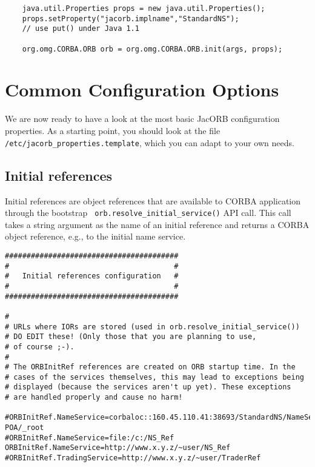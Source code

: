 \small{
\begin{verbatim}
    java.util.Properties props = new java.util.Properties();
    props.setProperty("jacorb.implname","StandardNS");
    // use put() under Java 1.1

    org.omg.CORBA.ORB orb = org.omg.CORBA.ORB.init(args, props);
\end{verbatim}
}

\section{Common Configuration Options}

We are now ready to have a look at the most basic JacORB configuration
properties. As a starting point, you should look at the file {\tt
  /etc/jacorb\_properties.template}, which you can adapt to your own
needs.

\subsection{Initial references}

Initial references are object references that are available to CORBA
application through the bootstrap {\tt
  orb.resolve\_initial\_service()} API call. This call takes a string
argument as the name of an initial reference and returns a CORBA
object reference, e.g., to the initial name service.

\renewcommand{\baselinestretch}{0.9}
\small{
\begin{verbatim}
########################################
#                                      #
#   Initial references configuration   #
#                                      #
########################################

#
# URLs where IORs are stored (used in orb.resolve_initial_service())
# DO EDIT these! (Only those that you are planning to use,
# of course ;-).
#
# The ORBInitRef references are created on ORB startup time. In the
# cases of the services themselves, this may lead to exceptions being
# displayed (because the services aren't up yet). These exceptions
# are handled properly and cause no harm!

#ORBInitRef.NameService=corbaloc::160.45.110.41:38693/StandardNS/NameServer-POA/_root
#ORBInitRef.NameService=file:/c:/NS_Ref
ORBInitRef.NameService=http://www.x.y.z/~user/NS_Ref
#ORBInitRef.TradingService=http://www.x.y.z/~user/TraderRef
\end{verbatim}
}
\renewcommand{\baselinestretch}{1.0}
\small\normalsize

